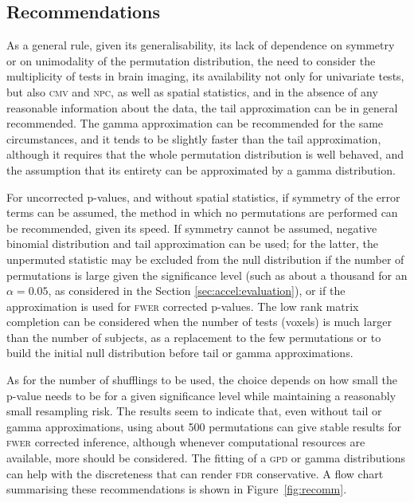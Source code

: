 \subsection{Recommendations}

As a general rule, given its generalisability, its lack of dependence on symmetry or on unimodality of the permutation distribution, the need to consider the multiplicity of tests in brain imaging, its availability not only for univariate tests, but also \textsc{cmv} and \textsc{npc}, as well as spatial statistics, and in the absence of any reasonable information about the data, the tail approximation can be in general recommended. The gamma approximation can be recommended for the same circumstances, and it tends to be slightly faster than the tail approximation, although it requires that the whole permutation distribution is well behaved, and the assumption that its entirety can be approximated by a gamma distribution.

For uncorrected p-values, and without spatial statistics, if symmetry of the error terms can be assumed, the method in which no permutations are performed can be recommended, given its speed. If symmetry cannot be assumed, negative binomial distribution and tail approximation can be used; for the latter, the unpermuted statistic may be excluded from the null distribution if the number of permutations is large given the significance level (such as about a thousand for an $\alpha=0.05$, as considered in the Section  \ref{sec:accel:evaluation}), or if the approximation is used for \textsc{fwer} corrected p-values. The low rank matrix completion can be considered when the number of tests (voxels) is much larger than the number of subjects, as a replacement to the few permutations or to build the initial null distribution before tail or gamma approximations.

As for the number of shufflings to be used, the choice depends on how small the p-value needs to be for a given significance level while maintaining a reasonably small resampling risk. The results seem to indicate that, even without tail or gamma approximations, using about 500 permutations can give stable results for \textsc{fwer} corrected inference, although whenever computational resources are available, more should be considered. The fitting of a \textsc{gpd} or gamma distributions can help with the discreteness that can render \textsc{fdr} conservative. A flow chart summarising these recommendations is shown in Figure~\ref{fig:recomm}.


